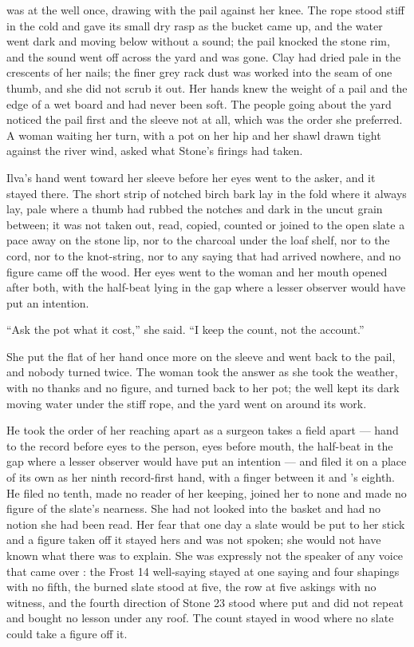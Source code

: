 \scenebreak

 was at the well once, drawing with the pail against her knee. The rope stood stiff in the  cold and gave its small dry rasp as the bucket came up, and the water went dark and moving below without a sound; the pail knocked the stone rim, and the sound went off across the yard and was gone. Clay had dried pale in the crescents of her nails; the finer grey rack dust was worked into the seam of one thumb, and she did not scrub it out. Her hands knew the weight of a pail and the edge of a wet board and had never been soft. The people going about the yard noticed the pail first and the sleeve not at all, which was the order she preferred. A woman waiting her turn, with a pot on her hip and her shawl drawn tight against the river wind, asked what Stone's firings had taken.

Ilva's hand went toward her sleeve before her eyes went to the asker, and it stayed there. The short strip of notched birch bark lay in the fold where it always lay, pale where a thumb had rubbed the notches and dark in the uncut grain between; it was not taken out, read, copied, counted or joined to the open slate a pace away on the stone lip, nor to the charcoal under the loaf shelf, nor to the cord, nor to the knot-string, nor to any saying that had arrived nowhere, and no figure came off the wood. Her eyes went to the woman and her mouth opened after both, with the half-beat lying in the gap where a lesser observer would have put an intention.

“Ask the pot what it cost,” she said. “I keep the count, not the account.”

She put the flat of her hand once more on the sleeve and went back to the pail, and nobody turned twice. The woman took the answer as she took the weather, with no thanks and no figure, and turned back to her pot; the well kept its dark moving water under the stiff rope, and the yard went on around its work.

He took the order of her reaching apart as a surgeon takes a field apart --- hand to the record before eyes to the person, eyes before mouth, the half-beat in the gap where a lesser observer would have put an intention --- and filed it on a place of its own as her ninth record-first hand, with a finger between it and 's eighth. He filed no tenth, made no reader of her keeping, joined her to none and made no figure of the slate's nearness. She had not looked into the basket and had no notion she had been read. Her fear that one day a slate would be put to her stick and a figure taken off it stayed hers and was not spoken; she would not have known what there was to explain. She was expressly not the speaker of any voice that came over : the Frost 14 well-saying stayed at one saying and four shapings with no fifth, the burned slate stood at five, the row at five askings with no witness, and the fourth direction of Stone 23 stood where put and did not repeat and bought no lesson under any roof. The count stayed in wood where no slate could take a figure off it.

